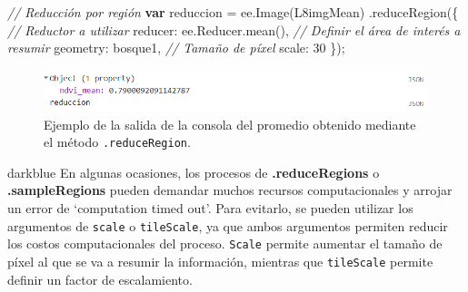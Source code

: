 \documentclass[
  12pt,
  letterpaper,
  twoside]{book}
\newenvironment{Shaded}{\begin{snugshade}}{\end{snugshade}}
\newcommand{\AttributeTok}[1]{\textcolor[rgb]{0.48,0.12,0.64}{#1}}
\newcommand{\CommentTok}[1]{\textcolor[rgb]{0.24,0.58,0.00}{\textit{#1}}}
\newcommand{\DataTypeTok}[1]{\textcolor[rgb]{0.00,0.00,0.00}{#1}}
\newcommand{\DecValTok}[1]{\textcolor[rgb]{0.28,0.53,0.93}{#1}}
\newcommand{\FunctionTok}[1]{\textcolor[rgb]{0.48,0.12,0.64}{#1}}
\newcommand{\KeywordTok}[1]{\textcolor[rgb]{0.00,0.00,0.00}{\textbf{#1}}}
\newcommand{\NormalTok}[1]{#1}
\newcommand{\OperatorTok}[1]{\textcolor[rgb]{0.00,0.00,0.00}{#1}}
\newcommand\boldpurple[1]{\textcolor{darkpurple}{\textbf{#1}}}
\begin{document}
\begin{Shaded}
\begin{Highlighting}[]
\CommentTok{// Reducción por región}
\KeywordTok{var}\NormalTok{ reduccion }\OperatorTok{=}\NormalTok{ ee}\OperatorTok{.}\FunctionTok{Image}\NormalTok{(L8imgMean)}
  \OperatorTok{.}\FunctionTok{reduceRegion}\NormalTok{(\{}
    \CommentTok{// Reductor a utilizar}
    \DataTypeTok{reducer}\OperatorTok{:}\NormalTok{ ee}\OperatorTok{.}\AttributeTok{Reducer}\OperatorTok{.}\FunctionTok{mean}\NormalTok{()}\OperatorTok{,}
    \CommentTok{// Definir el área de interés a resumir}
    \DataTypeTok{geometry}\OperatorTok{:}\NormalTok{ bosque1}\OperatorTok{,}
    \CommentTok{// Tamaño de píxel}
    \DataTypeTok{scale}\OperatorTok{:} \DecValTok{30}
\NormalTok{  \})}\OperatorTok{;}
\end{Highlighting}
\end{Shaded}



\begin{figure}[H]

{\centering \includegraphics[width=0.95\linewidth]{Img/reduccion11} 

}

\caption{Ejemplo de la salida de la consola del promedio obtenido mediante el método \texttt{.reduceRegion}.}\label{fig:fc112}
\end{figure}

\begin{bluebox2}

\begin{awesomeblock}{5pt}{\faLightbulb}{darkblue}
En algunas ocasiones, los procesos de \boldpurple{.reduceRegions} o
\boldpurple{.sampleRegions} pueden demandar muchos recursos computacionales y
arrojar un error de `computation timed out'. Para evitarlo, se pueden
utilizar los argumentos de \texttt{scale} o \texttt{tileScale}, ya que ambos
argumentos permiten reducir los costos computacionales del proceso.
\texttt{Scale} permite aumentar el tamaño de píxel al que se va a resumir la
información, mientras que \texttt{tileScale} permite definir un factor de
escalamiento.

\end{awesomeblock}

\end{bluebox2}
\end{document}
